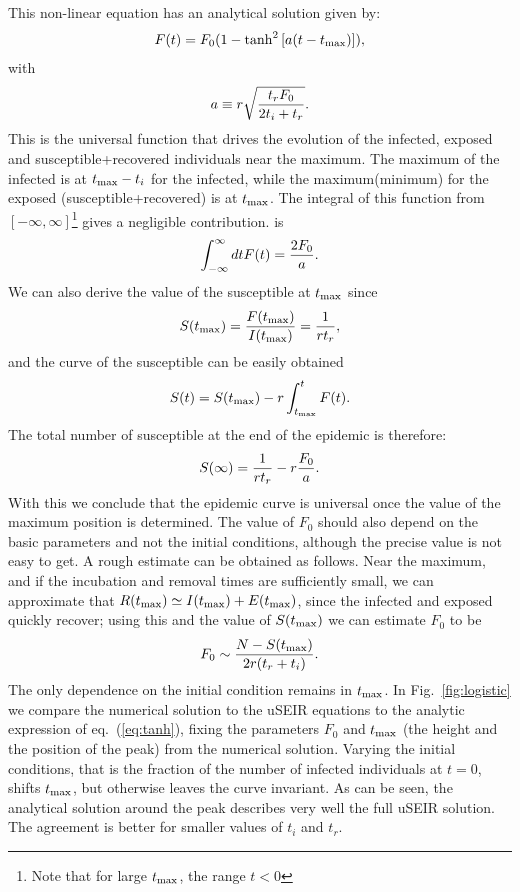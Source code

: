 \documentclass[a4paper,oneside,11pt]{article}
\begin{document}
 This non-linear equation has an analytical solution given by:
\begin{eqnarray}
F(t) = F_0 \large(1 - \tanh^2\left[ a (t-t_{\rm max})\right]\large),
\label{eq:tanh}
\end{eqnarray}
with
\begin{eqnarray}
a\equiv r \sqrt{{t_r F_0\over 2 t_i+t_r}}.
\label{eq:a}
\end{eqnarray}
This is the universal function that drives the evolution of the infected, exposed and susceptible+recovered individuals near the maximum. The maximum of the infected is at $t_{\rm max}-t_i$ for the infected, while the maximum(minimum) for the exposed (susceptible+recovered) is at $t_{\rm max}$. The integral of this function from $[-\infty, \infty]$\footnote{Note that for large $t_{\rm max}$, the range $t<0$} gives a negligible contribution. is
\begin{eqnarray}
\int_{-\infty}^{\infty} dt F(t) = {2 F_0 \over a}.
\end{eqnarray}
We can also derive the value of the susceptible at $t_{\rm max}$ since
\begin{eqnarray}
S(t_{\rm max}) = {F(t_{\rm max}) \over I(t_{\rm max})} = {1  \over r t_r},
\end{eqnarray}
and the curve of the susceptible can be easily obtained
\begin{eqnarray}
S(t) = S(t_{\rm max}) - r \int_{t_{\rm max}}^t F(t).
\end{eqnarray}
The total number of susceptible at the end of the epidemic is therefore:
\begin{eqnarray}
S(\infty) = {1\over r t_r } - r {F_0\over a}.
\end{eqnarray}
With this we conclude that the epidemic curve is universal once the value of the maximum position is determined. The value of $F_0$ should also
depend on the basic parameters and not the initial conditions, although
the precise value is not easy to get. A rough estimate can be obtained as follows. Near the maximum, and if the incubation and removal times are sufficiently small, we can approximate that $R(t_{\rm max}) \simeq I(t_{\rm max}) + E(t_{\rm max})$, since the infected and exposed quickly recover; using this and the value of $S(t_{\rm max})$ we can estimate $F_0$ to be
\begin{eqnarray}
F_0 \sim {N-S(t_{\rm max})\over 2 r (t_r +  t_i)}.
\label{eq:rough}
\end{eqnarray}
The only dependence on the initial condition remains in $t_{\rm max}$.
In Fig.~\ref{fig:logistic} we compare the numerical solution to the uSEIR equations to the analytic expression of eq.~(\ref{eq:tanh}), fixing the parameters $F_0$ and $t_{\rm max}$ (the height and the position of the peak) from the numerical solution. Varying the initial conditions, that is the fraction of the number of infected individuals at $t=0$, shifts $t_{\rm max}$, but otherwise leaves the curve invariant. As can be seen, the analytical solution around the peak describes very well the full uSEIR solution. The agreement is better for smaller values of $t_i$ and $t_r$. 
\end{document}
